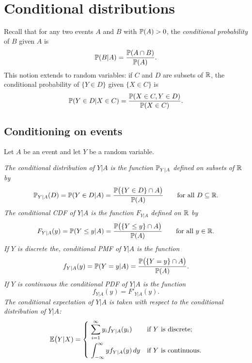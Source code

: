 
\section{Conditional distributions}\label{sec:cond_dist}

Recall that for any two events $A$ and $B$ with $\mathbb{P}(A)>0$, the \emph{conditional probability} of $B$ given $A$ is 
\[
\mathbb{P}(B|A) = \frac{\mathbb{P}(A\cap B)}{\mathbb{P}(A)}.
\]
This notion extends to random variables: if $C$ and $D$ are subsets of $\mathbb{R}$, the conditional probability of $\{Y\in D\}$ given $\{X\in C\}$ is
\[
\mathbb{P}(Y\in D|X\in C) = \frac{\mathbb{P}(X\in C,Y\in D)}{\mathbb{P}(X\in C)}.
\]

\subsection{Conditioning on events}
Let $A$ be an event and let $Y$ be a random variable.

\begin{definition}\label{def:conditional_on_events}
\ben
\it The \emph{conditional distribution} of $Y|A$ is the function $\mathbb{P}_{Y|A}$ defined on subsets of $\mathbb{R}$ by
\[
\mathbb{P}_{Y|A}(D) = \mathbb{P}(Y\in D|A) = \frac{\mathbb{P}\big(\{Y\in D\}\cap A\big)}{\mathbb{P}(A)}\qquad\text{for all $D\subseteq\mathbb{R}$}.
\]
\it The \emph{conditional CDF} of $Y|A$ is the function $F_{Y|A}$ defined on $\mathbb{R}$ by
\[
F_{Y|A}(y) = \mathbb{P}(Y\leq y|A) = \frac{\mathbb{P}\big(\{Y\leq y\}\cap A\big)}{\mathbb{P}(A)}\qquad\text{for all $y\in\mathbb{R}$}.
\]
\it If $Y$ is discrete the, \emph{conditional PMF of $Y|A$} is the function 
\[
f_{Y|A}(y) = \mathbb{P}(Y=y|A) = \frac{\mathbb{P}\big(\{Y=y\}\cap A\big)}{\mathbb{P}(A)}.
\]
\it If $Y$ is continuous the \emph{conditional PDF of $Y|A$} is the function 
\[
f_{Y|A}(y) = F'_{Y|A}(y).
\]
\it The \emph{conditional expectation of $Y|A$} is taken with respect to the conditional distribution of $Y|A$:
\[
\mathbb{E}\big(Y|X) = \begin{cases}
	\ \displaystyle\sum_{i=1}^{\infty} y_i f_{Y|A}(y_i)		& \text{if $Y$ is discrete;} \\[3ex]
	\ \displaystyle\int_{-\infty}^{\infty} y f_{Y|A}(y)\,dy	& \text{if $Y$ is continuous.} 
\end{cases}
\]
\een
\end{definition}

